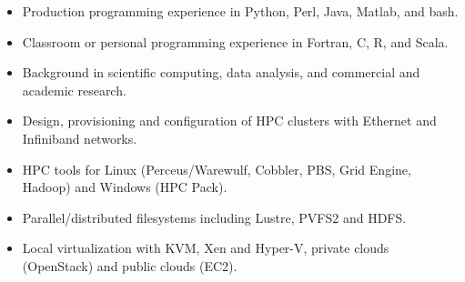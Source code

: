 \documentclass[10pt]{article}
\begin{document}
\begin{itemize}\setlength{\itemsep}{0cm}
  \setlength{\parskip}{0cm}
		
        \item Production programming experience in Python, Perl, Java, Matlab, and bash.
        \item Classroom or personal programming experience in Fortran, C, R, and Scala.
        \item Background in scientific computing, data analysis, and commercial and academic research.
        \item Design, provisioning and configuration of HPC clusters with Ethernet and Infiniband networks.
        \item HPC tools for Linux (Perceus/Warewulf, Cobbler, PBS, Grid Engine, Hadoop) and Windows (HPC Pack).
        \item Parallel/distributed filesystems including Lustre, PVFS2 and HDFS.
        \item Local virtualization with KVM, Xen and Hyper-V, private clouds (OpenStack) and public clouds (EC2).

        

\end{itemize}
\end{document}
